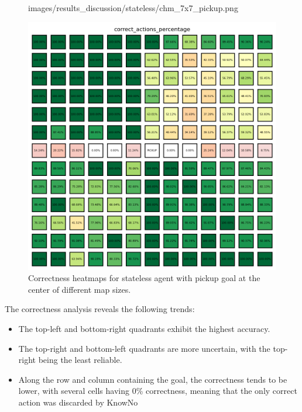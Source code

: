 \begin{figure}[h]
\begin{minipage}[b]{0.32\textwidth}
{      images/results_discussion/stateless/chm_7x7_pickup.png
    }
    \caption{7x7}
    \label{fig:chm_7x7_pickup}
  \end{minipage}
  \hfill
  \begin{minipage}[b]{0.32\textwidth}
    \centering
    \includegraphics[width=\textwidth]{
      images/results_discussion/stateless/chm_13x13_pickup.png
    }
    \caption{13x13}
    \label{fig:chm_13x13_pickup}
  \end{minipage}
  \caption{Correctness heatmaps for stateless agent with pickup goal at the
  center of different map sizes.}
  \label{fig:stateless_pickup_correctness}
\end{figure}
\vspace{5mm}

The correctness analysis reveals the following trends:
\begin{itemize}
  \item The top-left and bottom-right quadrants exhibit the highest accuracy.

  \item The top-right and bottom-left quadrants are more uncertain, with the top-right
    being the least reliable.

  \item Along the row and column containing the goal, the correctness tends to
    be lower, with several cells having 0\% correctness, meaning that the only correct
    action was discarded by KnowNo
\end{itemize}

